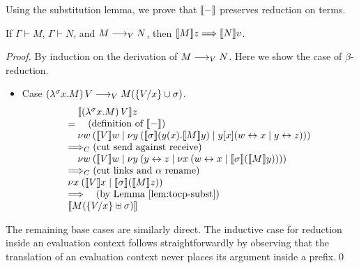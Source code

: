\documentclass[oribibl,orivec,envcountsame]{llncs}
\begin{document}

Using the substitution lemma, we prove that $\tocp -$ preserves reduction on terms.
%
\begin{theorem}
\label{thm:teval-preserved}
If $\Gamma \vdash M$, $\Gamma \vdash N$, and $M \teval N$, then $\tocp{M}z
\bigrto \tocp{N}v$.
\end{theorem}
%
\begin{proof}
By induction on the derivation of $M \teval N$. Here we show the case of $\beta$-reduction.
\begin{itemize}
\item Case $(\lambda^\sigma x.M)\,V \teval M(\{\bind x V\} \cup \sigma)$.
\[
\bl
\quad \tocp{(\lambda^\sigma x.M)\,V}z \\
= \quad (\text{definition of }\tocp{-}) \\
\quad \cut{w}{}{\tocp{V}w}{\cut{y}{}{\tocp{\sigma}(y(x).\tocp{M}y)}{y[x](\link{w}{x} \mid \link{y}{z})}} \\
\bigcrto (\text{cut send against receive}) \\
\quad \cut{w}{}{\tocp{V}w}{\cut{y}{}{\link{y}{z}}{\cut{x}{}{\link{w}{x}}{\tocp{\sigma}(\tocp{M}y)}}} \\
\bigcrto (\text{cut links and $\alpha$ rename}) \\
\cut{x}{}{\tocp{V}x}{\tocp{\sigma}(\tocp{M}z)} \\
\bigrto \quad (\text{by \lemref{tocp-subst}}) \\
\tocp{M(\{\bind x V\} \uplus \sigma)}
\el
\]
\end{itemize}
The remaining base cases are similarly direct. The inductive case for reduction inside an evaluation
context follows straightforwardly by observing that the translation of an evaluation context never
places its argument inside a prefix.\qed
\end{proof}
\end{document}
